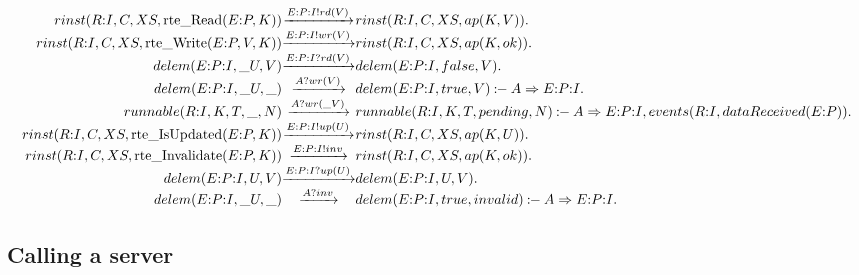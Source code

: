 \[
\begin{array}{r@{}c@{}l}
  \Preduce{rinst(R{:}I, C, XS, \rte{Read}(E{:}P,K))}       {\Psay{E{:}P{:}I}{rd(V)}} {rinst(R{:}I, C, XS, ap(K,V))} .
\\\Preduce{rinst(R{:}I, C, XS, \rte{Write}(E{:}P,V,K))}    {\Psay{E{:}P{:}I}{wr(V)}} {rinst(R{:}I, C, XS, ap(K,ok))}.
\\\Preduce{delem(E{:}P{:}I, \_U, V)}                       {\Phear{E{:}P{:}I}{rd(V)}}{delem(E{:}P{:}I, false, V)}        .
\\\Preduce{delem(E{:}P{:}I, \_U, \_)}                      {\Phear{A}{wr(V)}}        {delem(E{:}P{:}I, true, V)}            \Pif    A\Rightarrow{}E{:}P{:}I .
\\\Preduce{runnable(R{:}I, K, T, \_, N)}                   {\Phear{A}{wr(\_V)}}      {runnable(R{:}I, K, T, pending, N)}    \Pif    A\Rightarrow{}E{:}P{:}I, events(R{:}I, dataReceived(E{:}P))    .
\\\Preduce{rinst(R{:}I, C, XS, \rte{IsUpdated}(E{:}P,K))}  {\Psay{E{:}P{:}I}{up(U)}} {rinst(R{:}I, C, XS, ap(K,U))} .
\\\Preduce{rinst(R{:}I, C, XS, \rte{Invalidate}(E{:}P,K))} {\Psay{E{:}P{:}I}{inv}}   {rinst(R{:}I, C, XS, ap(K,ok))}.
\\\Preduce{delem(E{:}P{:}I, U, V)}                         {\Phear{E{:}P{:}I}{up(U)}}{delem(E{:}P{:}I, U, V)} .
\\\Preduce{delem(E{:}P{:}I, \_U, \_)}                      {\Phear{A}{inv}}          {delem(E{:}P{:}I, true, invalid)}      \Pif    A\Rightarrow{}E{:}P{:}I .
\end{array}
\]


\subsection{Calling a server}


